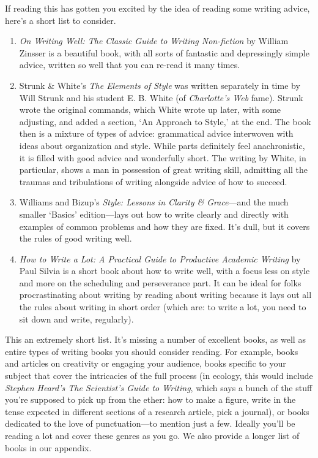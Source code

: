 \documentclass[11pt,letter]{article}
\begin{document}
If reading this has gotten you excited by the idea of reading some writing advice, here's a short list to consider. 
\begin{enumerate}
\item \emph{On Writing Well: The Classic Guide to Writing Non-fiction} by William Zinsser is a beautiful book, with all sorts of fantastic and depressingly simple advice, written so well that you can re-read it many times. 
\item Strunk \& White’s \emph{The Elements of Style} was written separately in time by Will Strunk and his student E. B. White (of \emph{Charlotte’s Web} fame). Strunk wrote the original commands, which White wrote up later, with some adjusting, and added a section, `An Approach to Style,’ at the end. The book then is a mixture of types of advice: grammatical advice interwoven with ideas about organization and style. While parts definitely feel anachronistic, it is filled with good advice and wonderfully short. The writing by White, in particular, shows a man in possession of great writing skill, admitting all the traumas and tribulations of writing alongside advice of how to succeed. 
\item Williams and Bizup's \emph{Style: Lessons in Clarity \& Grace}---and the much smaller `Basics' edition---lays out how to write clearly and directly with examples of common problems and how they are fixed. It's dull, but it covers the rules of good writing well. 
\item \emph{How to Write a Lot: A Practical Guide to Productive Academic Writing} by Paul Silvia is a short book about how to write well, with a focus less on style and more on the scheduling and perseverance part. It can be ideal for folks procrastinating about writing by reading about writing because it lays out all the rules about writing in short order (which are: to write a lot, you need to sit down and write, regularly). 
\end{enumerate}

This an extremely short list. It's missing a number of excellent books, as well as entire types of writing books you should consider reading. For example, books and articles on creativity or engaging your audience, books specific to your subject that cover the intricacies of the full process (in ecology, this would include \emph{Stephen Heard’s The Scientist’s Guide to Writing}, which says a bunch of the stuff you’re supposed to pick up from the ether: how to make a figure, write in the tense expected in different sections of a research article, pick a journal), or books dedicated to the love of punctuation---to mention just a few. Ideally you'll be reading a lot and cover these genres as you go. We also provide a longer list of books in our appendix. 
\end{document}
